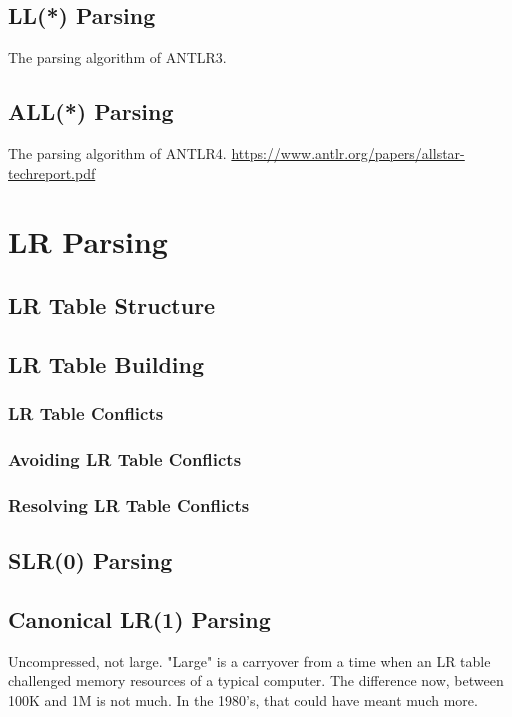 \documentclass{book}
\begin{document}
\section{LL(*) Parsing}
The parsing algorithm of ANTLR3.

\section{ALL(*) Parsing}
The parsing algorithm of ANTLR4.
\url{https://www.antlr.org/papers/allstar-techreport.pdf}


%
%
\chapter{LR Parsing}


\section{LR Table Structure}
\section{LR Table Building}

\subsection{LR Table Conflicts}
\subsection{Avoiding LR Table Conflicts}
\subsection{Resolving LR Table Conflicts}

\section{SLR(0) Parsing}

\section{Canonical LR(1) Parsing}
Uncompressed, not large. "Large" is a carryover from a time
when an LR table challenged memory resources of a 
typical computer. The difference now, between 100K and 1M
is not much. In the 1980's, that could have meant much more.
\end{document}
